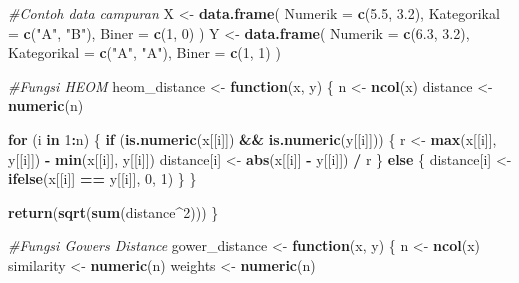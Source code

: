 \documentclass[
  oneside]{book}
\newenvironment{Shaded}{\begin{snugshade}}{\end{snugshade}}
\newcommand{\AttributeTok}[1]{\textcolor[rgb]{0.13,0.29,0.53}{#1}}
\newcommand{\CommentTok}[1]{\textcolor[rgb]{0.56,0.35,0.01}{\textit{#1}}}
\newcommand{\ControlFlowTok}[1]{\textcolor[rgb]{0.13,0.29,0.53}{\textbf{#1}}}
\newcommand{\DecValTok}[1]{\textcolor[rgb]{0.00,0.00,0.81}{#1}}
\newcommand{\FloatTok}[1]{\textcolor[rgb]{0.00,0.00,0.81}{#1}}
\newcommand{\FunctionTok}[1]{\textcolor[rgb]{0.13,0.29,0.53}{\textbf{#1}}}
\newcommand{\NormalTok}[1]{#1}
\newcommand{\OtherTok}[1]{\textcolor[rgb]{0.56,0.35,0.01}{#1}}
\newcommand{\SpecialCharTok}[1]{\textcolor[rgb]{0.81,0.36,0.00}{\textbf{#1}}}
\newcommand{\StringTok}[1]{\textcolor[rgb]{0.31,0.60,0.02}{#1}}
\begin{document}
\begin{Shaded}
\begin{Highlighting}[]
\CommentTok{\#Contoh data campuran}
\NormalTok{X }\OtherTok{\textless{}{-}} \FunctionTok{data.frame}\NormalTok{(}
  \AttributeTok{Numerik =} \FunctionTok{c}\NormalTok{(}\FloatTok{5.5}\NormalTok{, }\FloatTok{3.2}\NormalTok{),}
  \AttributeTok{Kategorikal =} \FunctionTok{c}\NormalTok{(}\StringTok{"A"}\NormalTok{, }\StringTok{"B"}\NormalTok{),}
  \AttributeTok{Biner =} \FunctionTok{c}\NormalTok{(}\DecValTok{1}\NormalTok{, }\DecValTok{0}\NormalTok{)}
\NormalTok{)}
\NormalTok{Y }\OtherTok{\textless{}{-}} \FunctionTok{data.frame}\NormalTok{(}
  \AttributeTok{Numerik =} \FunctionTok{c}\NormalTok{(}\FloatTok{6.3}\NormalTok{, }\FloatTok{3.2}\NormalTok{),}
  \AttributeTok{Kategorikal =} \FunctionTok{c}\NormalTok{(}\StringTok{"A"}\NormalTok{, }\StringTok{"A"}\NormalTok{),}
  \AttributeTok{Biner =} \FunctionTok{c}\NormalTok{(}\DecValTok{1}\NormalTok{, }\DecValTok{1}\NormalTok{)}
\NormalTok{)}

\CommentTok{\#Fungsi HEOM}
\NormalTok{heom\_distance }\OtherTok{\textless{}{-}} \ControlFlowTok{function}\NormalTok{(x, y) \{}
\NormalTok{  n }\OtherTok{\textless{}{-}} \FunctionTok{ncol}\NormalTok{(x)}
\NormalTok{  distance }\OtherTok{\textless{}{-}} \FunctionTok{numeric}\NormalTok{(n)}
  
  \ControlFlowTok{for}\NormalTok{ (i }\ControlFlowTok{in} \DecValTok{1}\SpecialCharTok{:}\NormalTok{n) \{}
    \ControlFlowTok{if}\NormalTok{ (}\FunctionTok{is.numeric}\NormalTok{(x[[i]]) }\SpecialCharTok{\&\&} \FunctionTok{is.numeric}\NormalTok{(y[[i]])) \{}
\NormalTok{      r }\OtherTok{\textless{}{-}} \FunctionTok{max}\NormalTok{(x[[i]], y[[i]]) }\SpecialCharTok{{-}} \FunctionTok{min}\NormalTok{(x[[i]], y[[i]])}
\NormalTok{      distance[i] }\OtherTok{\textless{}{-}} \FunctionTok{abs}\NormalTok{(x[[i]] }\SpecialCharTok{{-}}\NormalTok{ y[[i]]) }\SpecialCharTok{/}\NormalTok{ r}
\NormalTok{    \} }\ControlFlowTok{else}\NormalTok{ \{}
\NormalTok{      distance[i] }\OtherTok{\textless{}{-}} \FunctionTok{ifelse}\NormalTok{(x[[i]] }\SpecialCharTok{==}\NormalTok{ y[[i]], }\DecValTok{0}\NormalTok{, }\DecValTok{1}\NormalTok{)}
\NormalTok{    \}}
\NormalTok{  \}}
  
  \FunctionTok{return}\NormalTok{(}\FunctionTok{sqrt}\NormalTok{(}\FunctionTok{sum}\NormalTok{(distance}\SpecialCharTok{\^{}}\DecValTok{2}\NormalTok{)))}
\NormalTok{\}}

\CommentTok{\#Fungsi Gower\textquotesingle{}s Distance}
\NormalTok{gower\_distance }\OtherTok{\textless{}{-}} \ControlFlowTok{function}\NormalTok{(x, y) \{}
\NormalTok{  n }\OtherTok{\textless{}{-}} \FunctionTok{ncol}\NormalTok{(x)}
\NormalTok{  similarity }\OtherTok{\textless{}{-}} \FunctionTok{numeric}\NormalTok{(n)}
\NormalTok{  weights }\OtherTok{\textless{}{-}} \FunctionTok{numeric}\NormalTok{(n)}
  

\end{Highlighting}
\end{Shaded}
\end{document}
